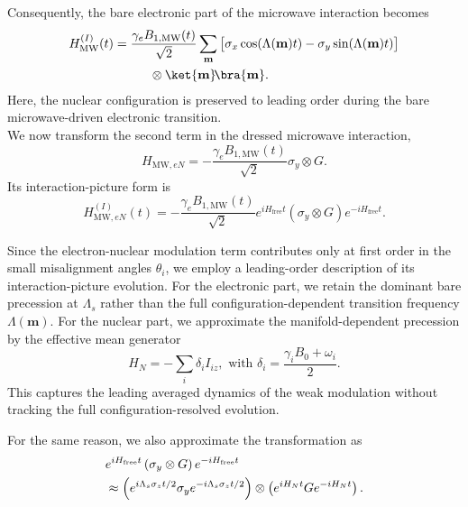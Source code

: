 \documentclass[
  aps,
  pra,
  reprint,            %
  superscriptaddress, %
  amsmath,amssymb,
  notitlepage
]{revtex4-2}
\begin{document}
Consequently, the bare electronic part of the microwave interaction becomes
\begin{equation}
\begin{aligned}
H_{\mathrm{MW}}^{(I)}(t)
&=
\frac{\gamma_e B_{1,\mathrm{MW}}(t)}{\sqrt2}
\sum_{\mathbf m}
\big[
\sigma_x\cos(\Lambda(\mathbf m)t)
-
\sigma_y\sin(\Lambda(\mathbf m)t)
\big]
\\
&\hspace{1cm}\otimes
\ket{\mathbf m}\!\bra{\mathbf m}.
\end{aligned}
\label{eq:HMW_I}
\end{equation}
Here, the nuclear configuration is preserved to leading order during the bare
microwave-driven electronic transition.\\

%


We now transform the second term in the dressed microwave interaction,
\[
H_{\mathrm{MW},eN}
=
-\frac{\gamma_e B_{1,\mathrm{MW}}(t)}{\sqrt2}
\sigma_y\otimes G .
\]
Its interaction-picture form is
\begin{equation}
H_{\mathrm{MW},eN}^{(I)}(t)
=
-\frac{\gamma_e B_{1,\mathrm{MW}}(t)}{\sqrt2}
e^{iH_{\mathrm{free}}t}
\left(
\sigma_y\otimes G
\right)
e^{-iH_{\mathrm{free}}t}.
\label{eq:HeN_IP_start}
\end{equation}

Since the electron-nuclear modulation term contributes only at first order in the small misalignment angles \(\theta_i\), we employ a leading-order description of its interaction-picture evolution. For the electronic part, we retain the dominant bare precession at \(\Lambda_s\) rather than the full configuration-dependent transition frequency \(\Lambda(\mathbf m)\). For the nuclear part, we approximate the manifold-dependent precession by the effective mean generator
\[
H_N
=
-\sum_i \delta_i I_{iz},
\,\, \text{with}\,\,
\delta_i
=
\frac{\gamma_iB_0+\omega_i}{2}.
\]
This captures the leading averaged dynamics of the weak modulation without
tracking the full configuration-resolved evolution.

For the same reason, we also approximate the transformation as
\begin{equation}
\begin{aligned}
&e^{iH_{\mathrm{free}}t}
\left(
\sigma_y\otimes G
\right)
e^{-iH_{\mathrm{free}}t}
\notag\\
&\approx
\left(
e^{i\Lambda_s\sigma_z t/2}
\sigma_y
e^{-i\Lambda_s\sigma_z t/2}
\right)
\otimes
\left(
e^{iH_N t}
G
e^{-iH_N t}
\right).
\end{aligned}
\label{eq:sigmayG_factorized}
\end{equation}
\end{document}
